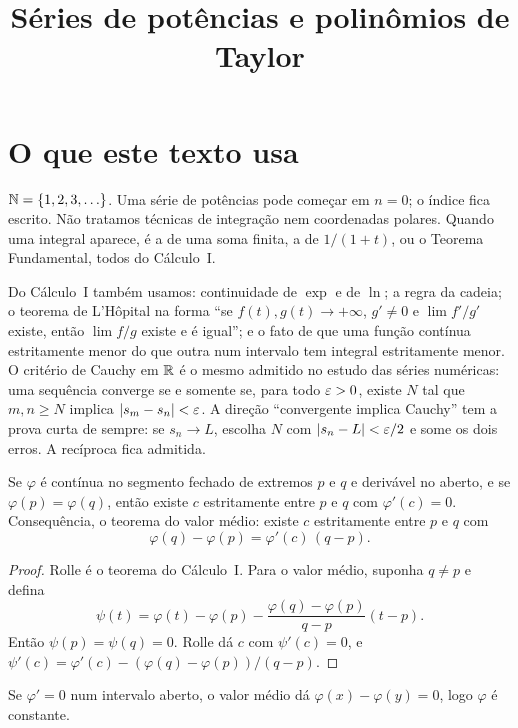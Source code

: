 \documentclass[11pt,a4paper]{article}
\title{Séries de potências e polinômios de Taylor}
\author{}
\date{}
\begin{document}
\maketitle
\tableofcontents

\section{O que este texto usa}

\(\mathbb{N}=\{1,2,3,\ldots\}\). Uma série de potências pode começar em \(n=0\); o índice fica escrito. Não tratamos técnicas de integração nem coordenadas polares. Quando uma integral aparece, é a de uma soma finita, a de \(1/(1+t)\), ou o Teorema Fundamental, todos do Cálculo~I.

Do Cálculo~I também usamos: continuidade de \(\exp\) e de \(\ln\); a regra da cadeia; o teorema de L'Hôpital na forma ``se \(f(t),g(t)\to+\infty\), \(g'\neq 0\) e \(\lim f'/g'\) existe, então \(\lim f/g\) existe e é igual''; e o fato de que uma função contínua estritamente menor do que outra num intervalo tem integral estritamente menor. O critério de Cauchy em \(\mathbb{R}\) é o mesmo admitido no estudo das séries numéricas: uma sequência converge se e somente se, para todo \(\varepsilon>0\), existe \(N\) tal que \(m,n\ge N\) implica \(\left\lvert s_m-s_n \right\rvert<\varepsilon\). A direção ``convergente implica Cauchy'' tem a prova curta de sempre: se \(s_n\to L\), escolha \(N\) com \(\left\lvert s_n-L \right\rvert<\varepsilon/2\) e some os dois erros. A recíproca fica admitida.

\begin{teorema}
Se \(\varphi\) é contínua no segmento fechado de extremos \(p\) e \(q\) e derivável no aberto, e se \(\varphi(p)=\varphi(q)\), então existe \(c\) estritamente entre \(p\) e \(q\) com \(\varphi'(c)=0\). Consequência, o teorema do valor médio: existe \(c\) estritamente entre \(p\) e \(q\) com
\[
\varphi(q)-\varphi(p)=\varphi'(c)\,(q-p).
\]
\end{teorema}

\begin{proof}
Rolle é o teorema do Cálculo~I. Para o valor médio, suponha \(q\neq p\) e defina
\[
\psi(t)=\varphi(t)-\varphi(p)-\frac{\varphi(q)-\varphi(p)}{q-p}(t-p).
\]
Então \(\psi(p)=\psi(q)=0\). Rolle dá \(c\) com \(\psi'(c)=0\), e \(\psi'(c)=\varphi'(c)-(\varphi(q)-\varphi(p))/(q-p)\).
\end{proof}

Se \(\varphi'=0\) num intervalo aberto, o valor médio dá \(\varphi(x)-\varphi(y)=0\), logo \(\varphi\) é constante.
\end{document}
